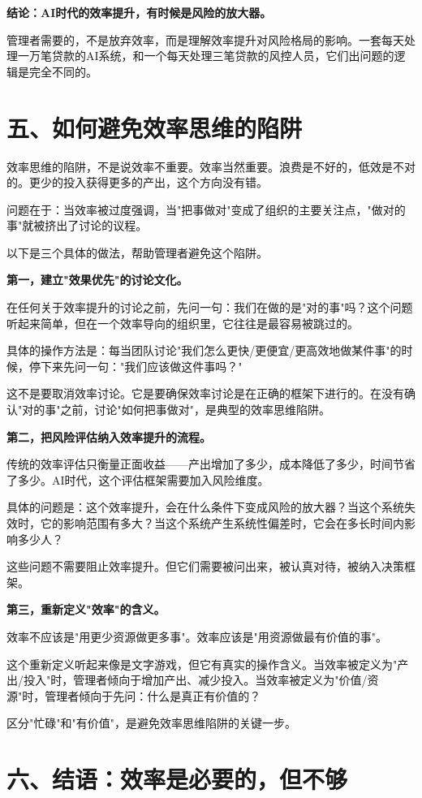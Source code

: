 \textbf{结论：AI时代的效率提升，有时候是风险的放大器。}

管理者需要的，不是放弃效率，而是理解效率提升对风险格局的影响。一套每天处理一万笔贷款的AI系统，和一个每天处理三笔贷款的风控人员，它们出问题的逻辑是完全不同的。


\section{五、如何避免效率思维的陷阱}


效率思维的陷阱，不是说效率不重要。效率当然重要。浪费是不好的，低效是不对的。更少的投入获得更多的产出，这个方向没有错。

问题在于：当效率被过度强调，当"把事做对"变成了组织的主要关注点，"做对的事"就被挤出了讨论的议程。

以下是三个具体的做法，帮助管理者避免这个陷阱。

\textbf{第一，建立"效果优先"的讨论文化。}

在任何关于效率提升的讨论之前，先问一句：我们在做的是"对的事"吗？这个问题听起来简单，但在一个效率导向的组织里，它往往是最容易被跳过的。

具体的操作方法是：每当团队讨论"我们怎么更快/更便宜/更高效地做某件事"的时候，停下来先问一句："我们应该做这件事吗？"

这不是要取消效率讨论。它是要确保效率讨论是在正确的框架下进行的。在没有确认"对的事"之前，讨论"如何把事做对"，是典型的效率思维陷阱。

\textbf{第二，把风险评估纳入效率提升的流程。}

传统的效率评估只衡量正面收益——产出增加了多少，成本降低了多少，时间节省了多少。AI时代，这个评估框架需要加入风险维度。

具体的问题是：这个效率提升，会在什么条件下变成风险的放大器？当这个系统失效时，它的影响范围有多大？当这个系统产生系统性偏差时，它会在多长时间内影响多少人？

这些问题不需要阻止效率提升。但它们需要被问出来，被认真对待，被纳入决策框架。

\textbf{第三，重新定义"效率"的含义。}

效率不应该是"用更少资源做更多事"。效率应该是"用资源做最有价值的事"。

这个重新定义听起来像是文字游戏，但它有真实的操作含义。当效率被定义为"产出/投入"时，管理者倾向于增加产出、减少投入。当效率被定义为"价值/资源"时，管理者倾向于先问：什么是真正有价值的？

区分"忙碌"和"有价值"，是避免效率思维陷阱的关键一步。


\section{六、结语：效率是必要的，但不够}


